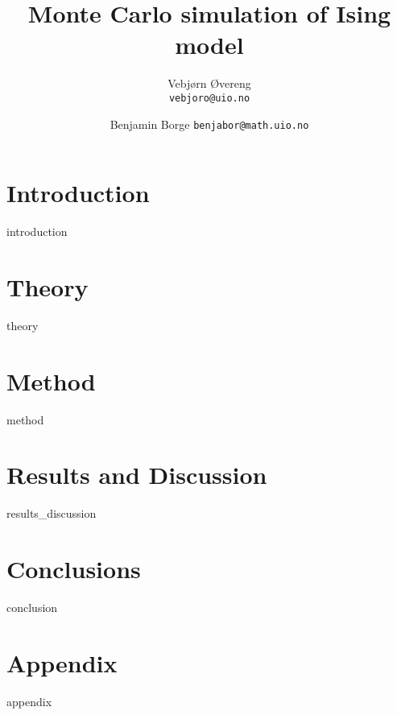 \documentclass[a4paper,10pt,english]{article}
\title{Monte Carlo simulation of Ising model}
\author{Vebjørn Øvereng\\
        \texttt{vebjoro@uio.no}
        \and
        Benjamin Borge
        \texttt{benjabor@math.uio.no}}
\begin{document}
  \maketitle


\section{Introduction}
{introduction}
\section{Theory}
{theory}

\section{Method}
{method}

\section{Results and Discussion}\label{sec:results}
{results_discussion}

\section{Conclusions}
{conclusion}

\section{Appendix}\label{sec:app}
{appendix}

\end{document}
